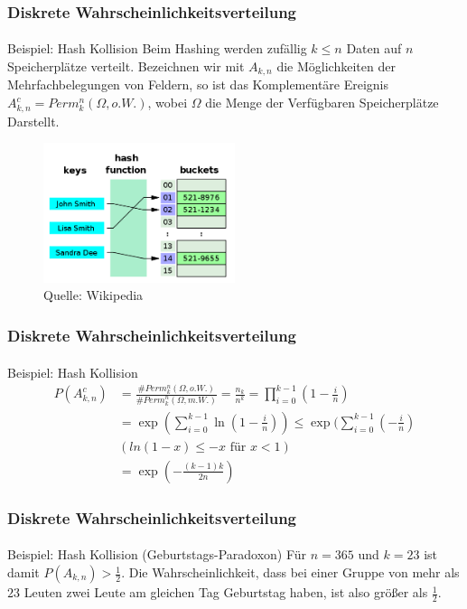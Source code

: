 \documentclass{beamer}
\begin{document}
\begin{frame}
    \frametitle{Diskrete Wahrscheinlichkeitsverteilung}
\framesubtitle{}

\begin{block}{Beispiel: Hash Kollision}
Beim Hashing werden zufällig $k \leq n$ Daten auf $n$ Speicherplätze  verteilt. Bezeichnen wir mit $A_{k,n}$ die Möglichkeiten der Mehrfachbelegungen von Feldern, so ist das Komplementäre Ereignis
$A^c_{k,n} = Perm^n_k(\Omega, o.W.)$,  wobei $\Omega$ die Menge der Verfügbaren Speicherplätze Darstellt. 
\end{block}


\begin{figure}[htp]
      \centering
    \includegraphics[width=0.5\textwidth]{img/hashtable}

      \caption{Quelle: Wikipedia}
\end{figure}


 \end{frame}


\begin{frame}
    \frametitle{Diskrete Wahrscheinlichkeitsverteilung}
\framesubtitle{}

\begin{block}{Beispiel: Hash Kollision}
\begin{align*}
 P(A^c_{k,n} ) & = \frac{\# Perm^n_k(\Omega, o.W.)}{ \# Perm^n_k(\Omega, m.W.)} = \frac{n_k}{n^k} = \prod_{i=0}^{k-1} (1- \frac{i}{n}) \\
& = \exp (\sum_{i=0}^{k-1} \ln {(1- \frac{i}{n})}) \leq  \exp (\sum_{i=0}^{k-1} (- \frac{i}{n}) \\
 & (ln(1-x) \leq -x \text{ für } x < 1) \\
&= \exp(- \frac{(k-1)k } {2n})
\end{align*}
\end{block}



 \end{frame}

\begin{frame}
    \frametitle{Diskrete Wahrscheinlichkeitsverteilung}
\framesubtitle{}

\begin{block}{Beispiel: Hash Kollision (Geburtstags-Paradoxon)}
Für $n=365$ und $k=23$ ist damit $ P(A_{k,n} ) > \frac{1}{2}$. Die Wahrscheinlichkeit, dass bei einer Gruppe von mehr als $23$ Leuten zwei Leute am gleichen Tag Geburtstag haben, ist also größer als $ \frac{1}{2}$.
\end{block}



 \end{frame}
\end{document}
